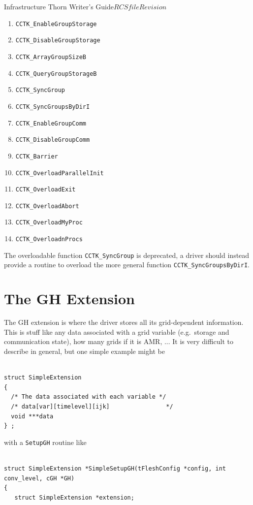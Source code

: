 \begin{cactuspart}{Infrastructure Thorn Writer's Guide}{$RCSfile$}{$Revision$}
\begin{enumerate}
\item{} {\tt CCTK\_EnableGroupStorage}
\item{} {\tt CCTK\_DisableGroupStorage}
\item{} {\tt CCTK\_ArrayGroupSizeB}
\item{} {\tt CCTK\_QueryGroupStorageB}
\item{} {\tt CCTK\_SyncGroup}
\item{} {\tt CCTK\_SyncGroupsByDirI}
\item{} {\tt CCTK\_EnableGroupComm}
\item{} {\tt CCTK\_DisableGroupComm}
\item{} {\tt CCTK\_Barrier}
\item{} {\tt CCTK\_OverloadParallelInit}
\item{} {\tt CCTK\_OverloadExit}
\item{} {\tt CCTK\_OverloadAbort}
\item{} {\tt CCTK\_OverloadMyProc}
\item{} {\tt CCTK\_OverloadnProcs}
\end{enumerate}

The overloadable function {\tt CCTK\_SyncGroup} is deprecated, a driver should
instead provide a routine to overload the more general function
{\tt CCTK\_SyncGroupsByDirI}.

\section{The GH Extension}

The GH extension is where the driver stores all its grid-dependent information.
This is stuff like any data associated with a grid variable (e.g.\ storage and
communication state), how many grids if it is AMR, ...  It is very difficult to
describe in general, but one simple example might be

\begin{verbatim}

struct SimpleExtension
{
  /* The data associated with each variable */
  /* data[var][timelevel][ijk]                */
  void ***data
} ;

\end{verbatim}

with a {\tt SetupGH} routine like

\begin{verbatim}

struct SimpleExtension *SimpleSetupGH(tFleshConfig *config, int conv_level, cGH *GH)
{
   struct SimpleExtension *extension;


\end{verbatim}
\end{cactuspart}
